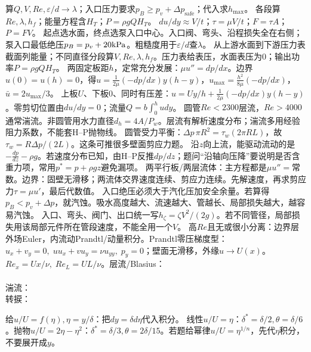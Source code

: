 算$Q,V,Re,\varepsilon/d\to\lambda$；入口压力要求$p_B\ge p_v+\Delta p_{\text{safe}}$；代入求$h_{\max}$。
各段算$Re,\lambda,h_f$；能量方程含$H_T$；$P=\rho gQH_T$。
$du/dy\approx V/t$；$\tau=\mu V/t$；$F=\tau A$；$P=FV$。
起点选水面，终点选泵入口中心。入口阀、弯头、沿程损失全在右侧；泵入口最低绝压$p_B=p_v+20{\rm kPa}$。粗糙度用于$\varepsilon/d$查$\lambda$。
从上游水面到下游压力表截面列能量；不同直径分段算$V,Re,\lambda,h_f$。压力表给表压，水面表压为0；输出功率$P=\rho gQH_T$。
两固定板距$h$，定常充分发展：$\mu u''=dp/dx$。边界$u(0)=u(h)=0$，得$u=\frac{1}{2\mu}(-dp/dx)y(h-y)$，$u_{\max}=\frac{h^2}{8\mu}(-dp/dx)$，$\bar u=2u_{\max}/3$。
上板$U$、下板0、同时有压差：$u=Uy/h+\frac{1}{2\mu}(-dp/dx)y(h-y)$。零剪切位置由$du/dy=0$；流量$Q=b\int_0^h udy$。
圆管$Re<2300$层流，$Re>4000$通常湍流。非圆管用水力直径$d_h=4A/P_w$。层流有解析速度分布；湍流多用经验阻力系数，不能套H--P抛物线。
圆管受力平衡：$\Delta p\,\pi R^2=\tau_w(2\pi RL)$，故$\tau_w=R\Delta p/(2L)$。这条可推很多壁面剪应力题。
沿$z$向上流，能驱动流动的是$-\frac{dp}{dz}-\rho g$。若速度分布已知，由H--P反推$dp/dz$；题问“沿轴向压降”要说明是否含重力项，常用$p^*=p+\rho gz$避免漏项。
两平行板/两层流体：主方程都是$\mu u''=$常数。边界：固壁无滑移；两流体交界速度连续、剪应力连续。先解速度，再求剪应力$\tau=\mu u'$，最后代数值。
入口绝压必须大于汽化压加安全余量。若算得$p_B<p_v+\Delta p$，就汽蚀。吸水高度越大、流速越大、管越长、局部损失越大，越容易汽蚀。
入口、弯头、阀门、出口统一写$h_\zeta=\zeta V^2/(2g)$。若不同管径，局部损失用该局部元件所在管段速度，不能全用一个$V$。
\schemebl
{}
高$Re$且无或很小分离：边界层外场Euler，内流动Prandtl/动量积分。Prandtl零压梯度型：$u_x+v_y=0,\;uu_x+vu_y=\nu u_{yy},\;p_y=0$；壁面无滑移，外缘$u\to U(x)$。$Re_x=Ux/\nu,\;Re_L=UL/\nu$。层流/Blasius：\\
\\
湍流：\\
转捩：\\

给$u/U=f(\eta),\eta=y/\delta$：把$dy=\delta d\eta$代入积分。
线性$u/U=\eta$：$\delta^*=\delta/2,\theta=\delta/6$。抛物$u/U=2\eta-\eta^2$：$\delta^*=\delta/3,\theta=2\delta/15$。若题给幂律$u/U=\eta^{1/n}$，先代$\eta$积分，不要展开成$y$。

